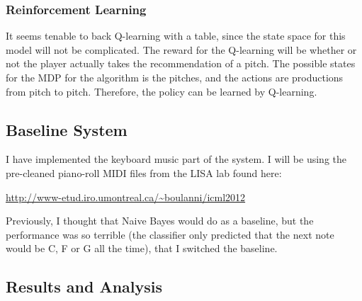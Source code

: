 \documentclass{article}
\begin{document}
\subsubsection*{Reinforcement Learning}

It seems tenable to back Q-learning with a table, since the state space for this model will not be complicated. The reward for the Q-learning will be whether or not the player actually takes the recommendation of a pitch. The possible states for the MDP for the algorithm is the pitches, and the actions are productions from pitch to pitch. Therefore, the policy can be learned by Q-learning.

\subsection*{Baseline System}
I have implemented the keyboard music part of the system. I will be using the pre-cleaned piano-roll MIDI files from the LISA lab found here:

\url{http://www-etud.iro.umontreal.ca/~boulanni/icml2012}

Previously, I thought that Naive Bayes would do as a baseline, but the performance was so terrible (the classifier only predicted that the next note would be C, F or G all the time), that I switched the baseline.

\subsection*{Results and Analysis}
\end{document}
